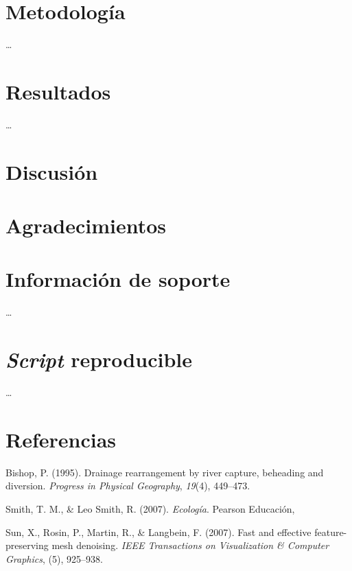 \documentclass[11pt,]{article}
\begin{document}
\section{Metodología}\label{metodologuxeda}

\ldots

\section{Resultados}\label{resultados}

\ldots

\section{Discusión}\label{discusiuxf3n}

\section{Agradecimientos}\label{agradecimientos}

\section{Información de soporte}\label{informaciuxf3n-de-soporte}

\ldots

\section{\texorpdfstring{\emph{Script}
reproducible}{Script reproducible}}\label{script-reproducible}

\ldots

\section*{Referencias}\label{referencias}

\hypertarget{refs}{}
\hypertarget{ref-bishop1995drainage}{}
Bishop, P. (1995). Drainage rearrangement by river capture, beheading
and diversion. \emph{Progress in Physical Geography}, \emph{19}(4),
449--473.

\hypertarget{ref-smith2007ecologia}{}
Smith, T. M., \& Leo Smith, R. (2007). \emph{Ecología}. Pearson
Educación,

\hypertarget{ref-sun2007fast}{}
Sun, X., Rosin, P., Martin, R., \& Langbein, F. (2007). Fast and
effective feature-preserving mesh denoising. \emph{IEEE Transactions on
Visualization \& Computer Graphics}, (5), 925--938.




\newpage
\singlespacing 
\end{document}
